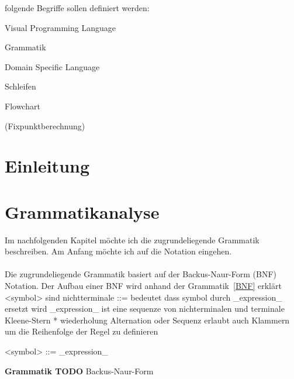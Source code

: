 \documentclass{article}
\begin{document}
    folgende Begriffe sollen definiert werden:

    Visual Programming Language

    Grammatik

    Domain Specific Language

    Schleifen

    Flowchart

    (Fixpunktberechnung)
    \newpage
    \tableofcontents
    \newpage
    \section{Einleitung}
    \newpage
    \section{Grammatikanalyse}
    Im nachfolgenden Kapitel möchte ich die zugrundeliegende Grammatik beschreiben. Am Anfang möchte ich auf die Notation eingehen.\\\\
    Die zugrundeliegende Grammatik basiert auf der Backus-Naur-Form (BNF) Notation. Der Aufbau einer BNF wird anhand der Grammatik~\ref{BNF} erklärt
    <symbol> sind nichtterminale
    ::= bedeutet dass symbol durch _expression_ ersetzt wird
    _expression_ ist eine sequenze von nichterminalen und terminale
    Kleene-Stern * wiederholung
    Alternation \textbar  oder
    Sequenz erlaubt auch Klammern um die Reihenfolge der Regel zu definieren
    \begin{grammar}
        <symbol> ::= _expression_
    \end{grammar}
    \textbf{Grammatik TODO} Backus-Naur-Form
    \label{BNF}
\end{document}
